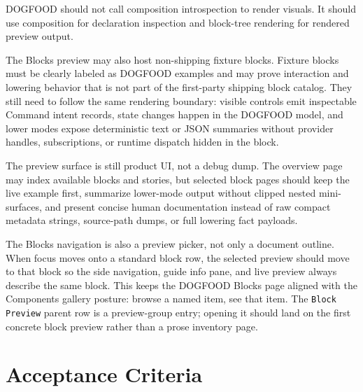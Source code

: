 DOGFOOD should not call composition introspection to render visuals. It should use composition for declaration inspection and block-tree rendering for rendered preview output.

The Blocks preview may also host non-shipping fixture blocks. Fixture blocks must be clearly labeled as DOGFOOD examples and may prove interaction and lowering behavior that is not part of the first-party shipping block catalog. They still need to follow the same rendering boundary: visible controls emit inspectable Command intent records, state changes happen in the DOGFOOD model, and lower modes expose deterministic text or JSON summaries without provider handles, subscriptions, or runtime dispatch hidden in the block.

The preview surface is still product UI, not a debug dump. The overview page may index available blocks and stories, but selected block pages should keep the live example first, summarize lower-mode output without clipped nested mini-surfaces, and present concise human documentation instead of raw compact metadata strings, source-path dumps, or full lowering fact payloads.

The Blocks navigation is also a preview picker, not only a document outline. When focus moves onto a standard block row, the selected preview should move to that block so the side navigation, guide info pane, and live preview always describe the same block. This keeps the DOGFOOD Blocks page aligned with the Components gallery posture: browse a named item, see that item. The \texttt{B\allowbreak{}l\allowbreak{}o\allowbreak{}c\allowbreak{}k\allowbreak{} \allowbreak{}P\allowbreak{}r\allowbreak{}e\allowbreak{}v\allowbreak{}i\allowbreak{}e\allowbreak{}w} parent row is a preview-group entry; opening it should land on the first concrete block preview rather than a prose inventory page.

\section{Acceptance Criteria}\label{record-129-acceptance-criteria}

